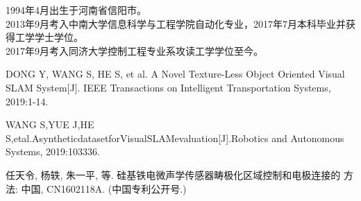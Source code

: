 \noindent 1994年4月出生于河南省信阳市。\\
\noindent 2013年9月考入中南大学信息科学与工程学院自动化专业，2017年7月本科毕业并获得工学学士学位。\\
\noindent 2017年9月考入同济大学控制工程专业系攻读工学学位至今。

\begin{enumerate}[{[}1{]}]
\item DONG Y, WANG S, HE S, et al. A Novel Texture-Less Object Oriented Visual SLAM
System[J]. IEEE Transactions on Intelligent Transportation Systems, 2019:1-14. 
\item WANG S,YUE J,HE S,etal.AsyntheticdatasetforVisualSLAMevaluation[J].Robotics
and Autonomous Systems, 2019:103336.
\end{enumerate}

\begin{enumerate}[{[}1{]}]
\item 任天令, 杨轶, 朱一平, 等. 硅基铁电微声学传感器畴极化区域控制和电极连接的
  方法: 中国, CN1602118A. (中国专利公开号.)
\end{enumerate}
